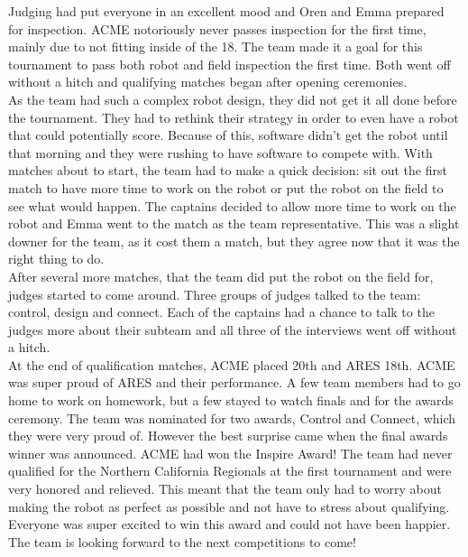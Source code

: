 \documentclass{article}
\begin{document}
Judging had put everyone in an excellent mood and Oren and Emma prepared for inspection. ACME notoriously never passes inspection for the first time, mainly due to not fitting inside of the 18. The team made it a goal for this tournament to pass both robot and field inspection the first time. Both went off without a hitch and qualifying matches began after opening ceremonies. \\

As the team had such a complex robot design, they did not get it all done before the tournament. They had to rethink their strategy in order to even have a robot that could potentially score. Because of this, software didn't get the robot until that morning and they were rushing to have software to compete with. With matches about to start, the team had to make a quick decision: sit out the first match to have more time to work on the robot or put the robot on the field to see what would happen. The captains decided to allow more time to work on the robot and Emma went to the match as the team representative. This was a slight downer for the team, as it cost them a match, but they agree now that it was the right thing to do. \\

After several more matches, that the team did put the robot on the field for, judges started to come around. Three groups of judges talked to the team: control, design and connect. Each of the captains had a chance to talk to the judges more about their subteam and all three of the interviews went off without a hitch. \\

At the end of qualification matches, ACME placed 20th and ARES 18th. ACME was super proud of ARES and their performance. A few team members had to go home to work on homework, but a few stayed to watch finals and for the awards ceremony. The team was nominated for two awards, Control and Connect, which they were very proud of. However the best surprise came when the final awards winner was announced. ACME had won the Inspire Award! The team had never qualified for the Northern California Regionals at the first tournament and were very honored and relieved. This meant that the team only had to worry about making the robot as perfect as possible and not have to stress about qualifying. Everyone was super excited to win this award and could not have been happier. The team is looking forward to the next competitions to come!\\
\end{document}
